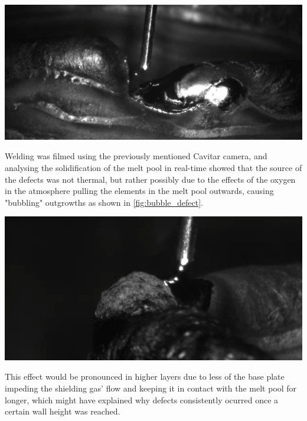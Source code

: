 \begin{minipage}{\linewidth}
    \centering
    \includegraphics[width=\linewidth]{images/ring_defect.PNG}
    \label{fig:ring_defect}
\end{minipage}

Welding was filmed using the previously mentioned Cavitar camera, and analysing the solidification of the melt pool in real-time showed that the source of the defects was not thermal, but rather possibly due to the effects of the oxygen in the atmosphere pulling the elements in the melt pool outwards, causing "bubbling" outgrowths as shown in \autoref{fig:bubble_defect}.

\begin{minipage}{\linewidth}
    \centering
    \includegraphics[width=\linewidth]{images/bubble_defect.PNG}
    \label{fig:bubble_defect}
\end{minipage}

This effect would be pronounced in higher layers due to less of the base plate impeding the shielding gas' flow and keeping it in contact with the melt pool for longer, which might have explained why defects consistently ocurred once a certain wall height was reached.

